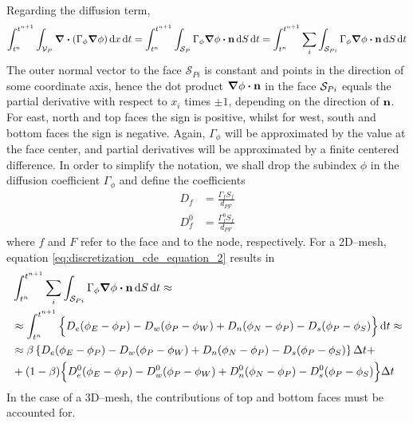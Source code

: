 Regarding the diffusion term,
\begin{equation} \label{eq:discretization_cde_equation_2}
	\int_{t^n}^{t^{n+1}} \int_{\cv{P}} \div(\Gamma_\phi \grad{\phi}) \dd{x} \dd{t} = 
	\int_{t^n}^{t^{n+1}} \int_{\cs{P}} \Gamma_\phi \grad{\phi} \vdot \vb{n} \dd{S} \dd{t} = 
	\int_{t^n}^{t^{n+1}} \sum_i \int_{\cs{Pi}} \Gamma_\phi \grad{\phi} \vdot \vb{n} \dd{S} \dd{t}
\end{equation}
The outer normal vector to the face $\mathcal{S}_{Pi}$ is constant and points in
the direction of some coordinate axis, hence the dot product $\grad{\phi} \vdot
\vb{n}$ in the face $\mathcal{S}_{Pi}$ equals the partial derivative with respect to
$x_i$ times $\pm 1$, depending on the direction of $\vb{n}$. For east, north and
top faces the sign is positive, whilst for west, south and bottom faces the sign
is negative. Again, $\Gamma_\phi$ will be approximated by the value at the face
center, and partial derivatives will be approximated by a finite centered
difference. In order to simplify the notation, we shall drop the subindex $\phi$ in the diffusion
coefficient $\Gamma_\phi$ and define the coefficients
\begin{align}
	D_f &= \frac{\Gamma_f S_f}{d_{PF}} \label{eq:coefficient_df} \\
	D_f^0 &= \frac{\Gamma_f^0 S_f}{d_{PF}}
\end{align}
where $f$ and $F$ refer to the face and to the node, respectively. For a 2D--mesh, equation
\eqref{eq:discretization_cde_equation_2} results in
\begin{align*}
	&\int_{t^n}^{t^{n+1}} \sum_i \int_{\cs{Pi}} \Gamma_\phi \grad{\phi} \vdot \vb{n} \dd{S} \dd{t} 
	\approx \\ 
	&\approx 
	\int_{t^n}^{t^{n+1}}
	\Big\{ 
	D_e (\phi_E - \phi_P) - D_w (\phi_P - \phi_W) + D_n (\phi_N - \phi_P) - D_s (\phi_P - \phi_S) 
	\Big\} \dd{t} \approx \\
	&\approx
	\beta 
	\left\{ 
		D_e (\phi_E - \phi_P) - D_w (\phi_P - \phi_W) + D_n (\phi_N - \phi_P) - D_s (\phi_P - \phi_S) 
	\right\} \Delta t + \\
	&+ (1 - \beta)
	\Big\{ 
		D_e^0 (\phi_E - \phi_P) - D_w^0 (\phi_P - \phi_W) + D_n^0 (\phi_N - \phi_P) - D_s^0 (\phi_P - \phi_S) 
	\Big\} \Delta t
\end{align*}
In the case of a 3D--mesh, the contributions of top and bottom faces must be
accounted for.

